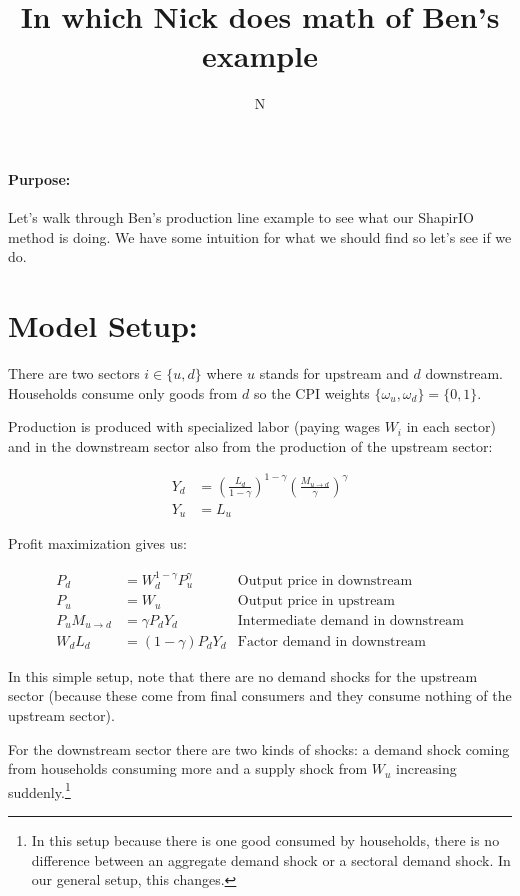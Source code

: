 \documentclass[12pt,english]{article}
\begin{document}
\title{In which Nick does math of Ben's example}
\author{N}
\maketitle

\paragraph{Purpose:} Let's walk through Ben's production line example to see what our ShapirIO method is doing. We have some intuition for what we should find so let's see if we do.


\section*{Model Setup:}

There are two sectors $i\in \{u,d\}$ where $u$ stands for upstream and $d$ downstream. Households consume only goods from $d$ so the CPI weights $\{\omega_u,\omega_d\} = \{0,1\}$.

Production is produced with specialized labor (paying wages $W_i$ in each sector) and in the downstream sector also from the production of the upstream sector:

\begin{align*}
	Y_d &= \left(\frac{L_d}{1-\gamma}\right)^{1-\gamma} \left(\frac{M_{u\rightarrow d}}{\gamma}\right)^\gamma\\
	Y_u&=L_u
\end{align*}

Profit maximization gives us:

\begin{align*}
	P_d &= W_d^{1-\gamma}P_u^\gamma & \text{Output price in downstream}\\
	P_u&=W_u& \text{Output price in upstream}\\
	P_uM_{u\rightarrow d}&=\gamma P_d Y_d& \text{Intermediate demand in downstream}\\
	W_dL_d&=(1-\gamma) P_d Y_d& \text{Factor demand in downstream}
\end{align*}

In this simple setup, note that there are no demand shocks for the upstream sector (because these come from final consumers and they consume nothing of the upstream sector). 

For the downstream sector there are two kinds of shocks: a demand shock coming from households consuming more and a supply shock from $W_u$ increasing suddenly.\footnote{In this setup because there is one good consumed by households, there is no difference between an aggregate demand shock or a sectoral demand shock. In our general setup, this changes.}
\end{document}
